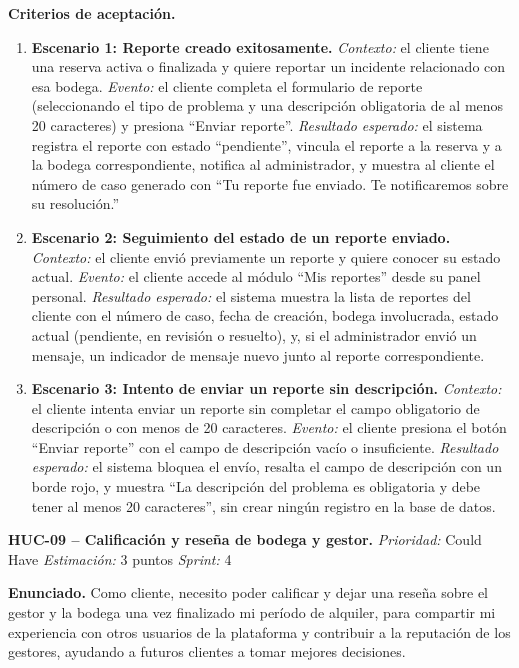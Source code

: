 \textbf{Criterios de aceptación.}
\begin{enumerate}
\item \textbf{Escenario 1: Reporte creado exitosamente.} \textit{Contexto:} el cliente tiene una reserva activa o finalizada y quiere reportar un incidente relacionado con esa bodega. \textit{Evento:} el cliente completa el formulario de reporte (seleccionando el tipo de problema y una descripción obligatoria de al menos 20 caracteres) y presiona ``Enviar reporte''. \textit{Resultado esperado:} el sistema registra el reporte con estado ``pendiente'', vincula el reporte a la reserva y a la bodega correspondiente, notifica al administrador, y muestra al cliente el número de caso generado con ``Tu reporte fue enviado. Te notificaremos sobre su resolución.''
\item \textbf{Escenario 2: Seguimiento del estado de un reporte enviado.} \textit{Contexto:} el cliente envió previamente un reporte y quiere conocer su estado actual. \textit{Evento:} el cliente accede al módulo ``Mis reportes'' desde su panel personal. \textit{Resultado esperado:} el sistema muestra la lista de reportes del cliente con el número de caso, fecha de creación, bodega involucrada, estado actual (pendiente, en revisión o resuelto), y, si el administrador envió un mensaje, un indicador de mensaje nuevo junto al reporte correspondiente.
\item \textbf{Escenario 3: Intento de enviar un reporte sin descripción.} \textit{Contexto:} el cliente intenta enviar un reporte sin completar el campo obligatorio de descripción o con menos de 20 caracteres. \textit{Evento:} el cliente presiona el botón ``Enviar reporte'' con el campo de descripción vacío o insuficiente. \textit{Resultado esperado:} el sistema bloquea el envío, resalta el campo de descripción con un borde rojo, y muestra ``La descripción del problema es obligatoria y debe tener al menos 20 caracteres'', sin crear ningún registro en la base de datos.
\end{enumerate}

\textbf{HUC-09 -- Calificación y reseña de bodega y gestor.} \label{req:HUC-09}
\textit{Prioridad:} Could Have \quad \textit{Estimación:} 3 puntos \quad \textit{Sprint:} 4

\textbf{Enunciado.} Como cliente, necesito poder calificar y dejar una reseña sobre el gestor y la bodega una vez finalizado mi período de alquiler, para compartir mi experiencia con otros usuarios de la plataforma y contribuir a la reputación de los gestores, ayudando a futuros clientes a tomar mejores decisiones.

